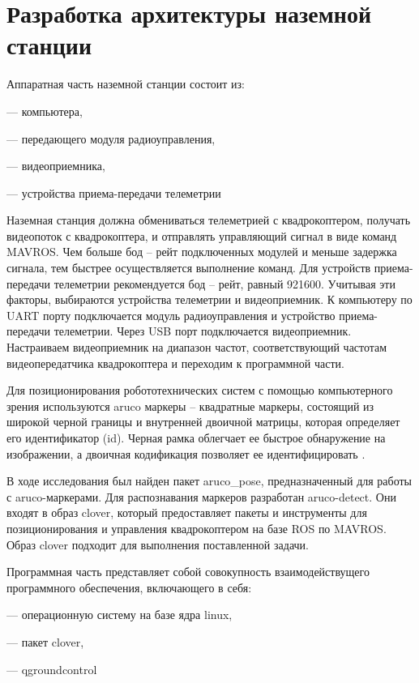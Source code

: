 
\section{Разработка архитектуры наземной станции}
Аппаратная часть наземной станции состоит из:

--- компьютера,

--- передающего модуля радиоуправления,

--- видеоприемника,

--- устройства приема-передачи телеметрии

Наземная станция должна обмениваться телеметрией с квадрокоптером, получать видеопоток с квадрокоптера, и отправлять управляющий сигнал в виде команд MAVROS. Чем больше бод -- рейт подключенных модулей и меньше задержка сигнала, тем быстрее осуществляется выполнение команд. Для устройств приема-передачи телеметрии рекомендуется бод -- рейт, равный 921600. Учитывая эти факторы, выбираются устройства телеметрии и видеоприемник.
К компьютеру по UART порту подключается модуль радиоуправления и устройство приема-передачи телеметрии. Через USB порт подключается видеоприемник. Настраиваем видеоприемник на диапазон частот, соответствующий частотам видеопередатчика квадрокоптера и переходим к программной части.

Для позиционирования робототехнических систем с помощью компьютерного зрения используются aruco маркеры -- квадратные маркеры, состоящий из широкой черной границы и внутренней двоичной матрицы, которая определяет его идентификатор (id). Черная рамка облегчает ее быстрое обнаружение на изображении, а двоичная кодификация позволяет ее идентифицировать \cite{opencv}.

В ходе исследования был найден пакет aruco\_pose, предназначенный для работы с aruco-маркерами. Для распознавания маркеров разработан aruco-detect. Они входят в образ clover, который предоставляет пакеты и инструменты для позиционирования и управления квадрокоптером на базе ROS по MAVROS. Образ clover подходит для выполнения поставленной задачи.

Программная часть представляет собой совокупность взаимодействущего программного обеспечения, включающего в себя:

--- операционную систему на базе ядра linux,

--- пакет clover,

--- qgroundcontrol

